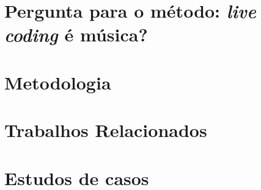 \documentclass[
	12pt,				%
	openright,			%
	twoside,			%
	a4paper,			%
	english,			%
	french,				%
	spanish,			%
        italian,                        %
	brazil				%
	]{abntex2}
\begin{document}

%
\tableofcontents*
\cleardoublepage
\textual




\chapter{Pergunta para o método: \emph{live coding} é música?}\label{cap:introducao}


\chapter{Metodologia}\label{cap:metodologia}


\chapter{Trabalhos Relacionados}\label{cap:trabalhos_relacionados}


\chapter{Estudos de casos}\label{cap:estudos_de_caso}
\end{document}
